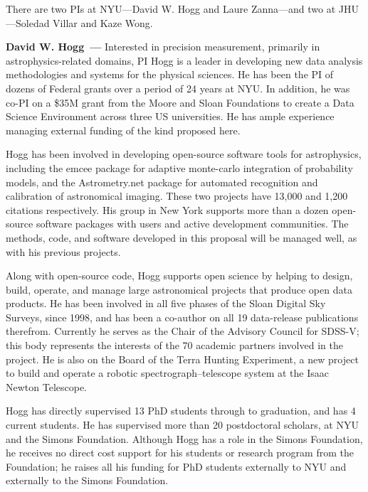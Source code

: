 \documentclass[11pt]{article}
\renewcommand{\paragraph}[1]{\medskip\par\noindent\textbf{#1~---}}
\begin{document}
There are two PIs at NYU---David W. Hogg and Laure Zanna---and two at JHU---Soledad Villar and Kaze Wong.

\paragraph{David W. Hogg}
Interested in precision measurement, primarily in astrophysics-related domains, PI Hogg is a leader in developing new data analysis methodologies and systems for the physical sciences.
He has been the PI of dozens of Federal grants over a period of 24 years at NYU.
In addition, he was co-PI on a \$35M grant from the Moore and Sloan Foundations to create a Data Science Environment across three US universities.
He has ample experience managing external funding of the kind proposed here.

Hogg has been involved in developing open-source software tools for astrophysics, including the emcee package \cite{emcee} for adaptive monte-carlo integration of probability models, and the Astrometry.net package \cite{astrometry} for automated recognition and calibration of astronomical imaging.
These two projects have 13,000 and 1,200 citations respectively.
His group in New York supports more than a dozen open-source software packages with users and active development communities.
The methods, code, and software developed in this proposal will be managed well, as with his previous projects.

Along with open-source code, Hogg supports open science by helping to design, build, operate, and manage large astronomical projects that produce open data products.
He has been involved in all five phases of the Sloan Digital Sky Surveys, since 1998, and has been a co-author on all 19 data-release publications therefrom.
Currently he serves as the Chair of the Advisory Council for SDSS-V; this body represents the interests of the 70 academic partners involved in the project.
He is also on the Board of the Terra Hunting Experiment, a new project to build and operate a robotic spectrograph--telescope system at the Isaac Newton Telescope.

Hogg has directly supervised 13 PhD students through to graduation, and has 4 current students.
He has supervised more than 20 postdoctoral scholars, at NYU and the Simons Foundation.
Although Hogg has a role in the Simons Foundation, he receives no direct cost support for his students or research program from the Foundation; he raises all his funding for PhD students externally to NYU and externally to the Simons Foundation.
\end{document}

